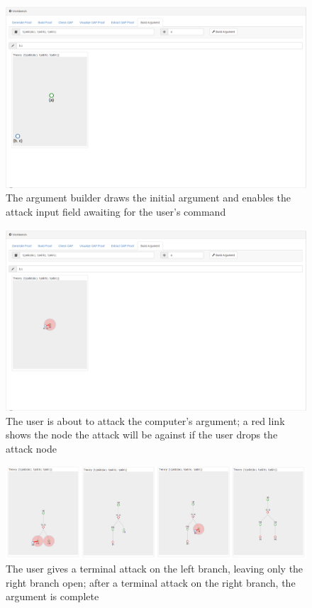 \documentclass[11pt,twoside,a4paper]{report}
\begin{document}
\begin{figure}[htp]
\centerline{\includegraphics[scale=0.3]{img/scr-client-argttack.png}}
\caption{The argument builder draws the initial argument and enables the attack input field awaiting for the user's command\label{fig:scrclientargttack}}
\end{figure}

\begin{figure}[htp]
\centerline{\includegraphics[scale=0.3]{img/scr-client-finishhim.png}}
\caption{The user is about to attack the computer's argument; a red link shows the node the attack will be against if the user drops the attack node\label{fig:scrclientfinishhim}}
\end{figure}

\begin{figure}[htp]
\centerline{\includegraphics[scale=0.3]{img/scr-client-fatality.png}}
\caption{The user gives a terminal attack on the left branch, leaving only the right branch open; after a terminal attack on the right branch, the argument is complete\label{fig:scrclientfatality}}
\end{figure}
\end{document}
